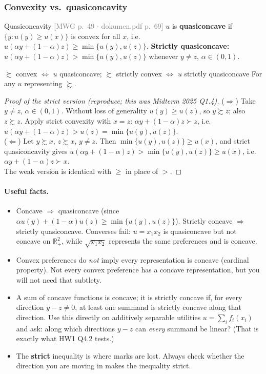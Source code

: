 \documentclass[11pt]{article}
\newcommand{\R}{\mathbb{R}}
\newcommand{\pref}{\succsim}
\newcommand{\spref}{\succ}
\newcommand{\mwg}[2]{\hfill{\small\textcolor{gray}{[MWG p.~#1 $\cdot$ dokumen.pdf p.~#2]}}}
\begin{document}
\subsubsection{Convexity vs.\ quasiconcavity}\label{sec:convex}
\begin{defn}{Quasiconcavity \mwg{49}{69}}
$u$ is \textbf{quasiconcave} if $\{y:u(y)\ge u(x)\}$ is convex for all $x$, i.e.\ $u(\alpha y+(1-\alpha)z)\ge\min\{u(y),u(z)\}$.
\textbf{Strictly quasiconcave:} $u(\alpha y+(1-\alpha)z)>\min\{u(y),u(z)\}$ whenever $y\ne z$, $\alpha\in(0,1)$.
\end{defn}

\begin{prop}{$\pref$ convex $\iff$ $u$ quasiconcave; $\pref$ strictly convex $\iff$ $u$ strictly quasiconcave}
For any $u$ representing $\pref$.
\end{prop}
\begin{proof}[Proof of the strict version (reproduce; this was Midterm 2025 Q1.4)]
($\Rightarrow$) Take $y\ne z$, $\alpha\in(0,1)$. Without loss of generality $u(y)\ge u(z)$, so $y\pref z$; also $z\pref z$. Apply strict convexity with $x=z$: $\alpha y+(1-\alpha)z\spref z$, i.e.\ $u(\alpha y+(1-\alpha)z)>u(z)=\min\{u(y),u(z)\}$.\\
($\Leftarrow$) Let $y\pref x$, $z\pref x$, $y\neq z$. Then $\min\{u(y),u(z)\}\ge u(x)$, and strict quasiconcavity gives $u(\alpha y+(1-\alpha)z)>\min\{u(y),u(z)\}\ge u(x)$, i.e.\ $\alpha y+(1-\alpha)z\spref x$.\\
The weak version is identical with $\ge$ in place of $>$.
\end{proof}

\paragraph{Useful facts.}
\begin{itemize}
\item Concave $\Rightarrow$ quasiconcave (since $\alpha u(y)+(1-\alpha)u(z)\ge\min\{u(y),u(z)\}$). Strictly concave $\Rightarrow$ strictly quasiconcave. Converses fail: $u=x_1x_2$ is quasiconcave but not concave on $\R^2_+$, while $\sqrt{x_1x_2}$ represents the same preferences and is concave.
\item Convex preferences do \emph{not} imply every representation is concave (cardinal property). Not every convex preference has a concave representation, but you will not need that subtlety.
\item A sum of concave functions is concave; it is strictly concave if, for every direction $y-z\neq0$, at least one summand is strictly concave along that direction. Use this directly on additively separable utilities $u=\sum_i f_i(x_i)$ and ask: along which directions $y-z$ can \emph{every} summand be linear? (That is exactly what HW1 Q4.2 tests.)
\item The \textbf{strict} inequality is where marks are lost. Always check whether the direction you are moving in makes the inequality strict.
\end{itemize}
\end{document}
